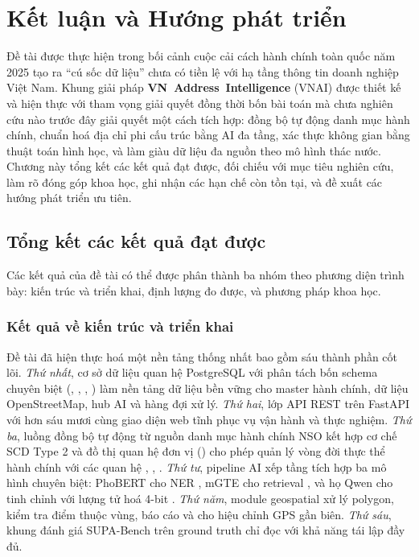 \chapter{Kết luận và Hướng phát triển}
\label{ch:conclusion}

Đề tài được thực hiện trong bối cảnh cuộc cải cách hành chính toàn quốc năm 2025 tạo ra ``cú sốc dữ liệu'' chưa có tiền lệ với hạ tầng thông tin doanh nghiệp Việt Nam. Khung giải pháp \textbf{VN~Address~Intelligence} (VNAI) được thiết kế và hiện thực với tham vọng giải quyết đồng thời bốn bài toán mà chưa nghiên cứu nào trước đây giải quyết một cách tích hợp: đồng bộ tự động danh mục hành chính, chuẩn hoá địa chỉ phi cấu trúc bằng AI đa tầng, xác thực không gian bằng thuật toán hình học, và làm giàu dữ liệu đa nguồn theo mô hình thác nước. Chương này tổng kết các kết quả đạt được, đối chiếu với mục tiêu nghiên cứu, làm rõ đóng góp khoa học, ghi nhận các hạn chế còn tồn tại, và đề xuất các hướng phát triển ưu tiên.

\section{Tổng kết các kết quả đạt được}
\label{sec:concl-summary}

Các kết quả của đề tài có thể được phân thành ba nhóm theo phương diện trình bày: kiến trúc và triển khai, định lượng đo được, và phương pháp khoa học.

\subsection{Kết quả về kiến trúc và triển khai}
\label{sec:concl-arch}

Đề tài đã hiện thực hoá một nền tảng thống nhất bao gồm sáu thành phần cốt lõi. \emph{Thứ nhất}, cơ sở dữ liệu quan hệ PostgreSQL với phân tách bốn schema chuyên biệt (, , , ) làm nền tảng dữ liệu bền vững cho master hành chính, dữ liệu OpenStreetMap, hub AI và hàng đợi xử lý. \emph{Thứ hai}, lớp API REST trên FastAPI với hơn sáu mươi  cùng giao diện web tĩnh phục vụ vận hành và thực nghiệm. \emph{Thứ ba}, luồng đồng bộ tự động từ nguồn danh mục hành chính NSO kết hợp cơ chế SCD Type 2 \cite{kimball2013} và đồ thị quan hệ đơn vị () cho phép quản lý vòng đời thực thể hành chính với các quan hệ , , . \emph{Thứ tư}, pipeline AI xếp tầng tích hợp ba mô hình chuyên biệt: PhoBERT cho NER \cite{nguyen2020phobert}, mGTE cho retrieval \cite{mgte2024}, và họ Qwen cho tinh chỉnh \cite{QwenTeam2024} với lượng tử hoá 4-bit \cite{Dettmers2022BNB}. \emph{Thứ năm}, module geospatial xử lý polygon, kiểm tra điểm thuộc vùng, báo cáo  và  cho hiệu chỉnh GPS gần biên. \emph{Thứ sáu}, khung đánh giá SUPA-Bench trên ground truth chỉ đọc với khả năng tái lập đầy đủ.

